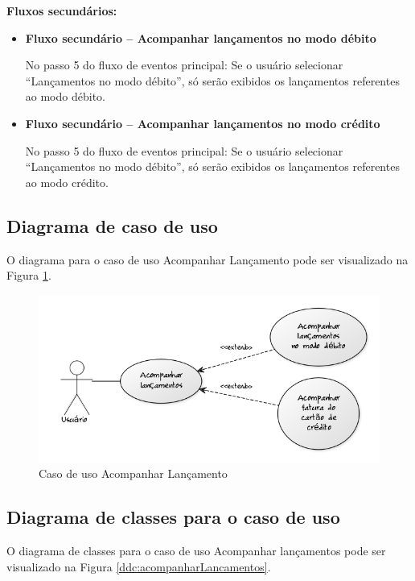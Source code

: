 \textbf{Fluxos secundários:}

\begin{itemize}
  \item \textbf{Fluxo secundário – Acompanhar lançamentos no modo débito}

  No passo 5 do fluxo de eventos principal:
  \subitem Se o usuário selecionar ``Lançamentos no modo débito'', só serão exibidos os lançamentos referentes ao modo débito.

  \item \textbf{Fluxo secundário – Acompanhar lançamentos no modo crédito}

  No passo 5 do fluxo de eventos principal:
  \subitem Se o usuário selecionar ``Lançamentos no modo débito'', só serão exibidos os lançamentos referentes ao modo crédito.
\end{itemize}

\subsection{Diagrama de caso de uso}

O diagrama para o caso de uso Acompanhar Lançamento pode ser visualizado na Figura \ref{cdu:acompanharLancamento}.

\begin{figure}[!htb]
     \centering
     \includegraphics[scale=0.6]{diagramas/caso-de-uso/imagens/acompanharLancamento.png}
     \caption{Caso de uso Acompanhar Lançamento}
     \label{cdu:acompanharLancamento}
\end{figure}

\subsection{Diagrama de classes para o caso de uso}

O diagrama de classes para o caso de uso Acompanhar lançamentos pode ser visualizado na Figura \ref{ddc:acompanharLancamentos}.

